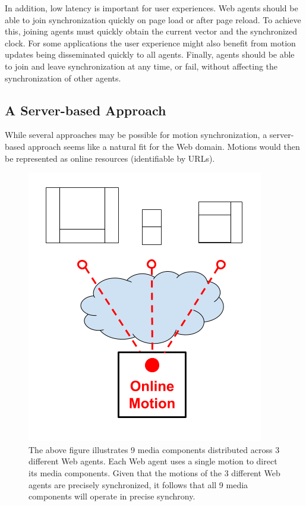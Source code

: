 In addition, low latency is important for user experiences. Web agents should
be able to join synchronization quickly on page load or after page reload. To
achieve this, joining agents must quickly obtain the current vector and the
synchronized clock. For some applications the user experience might also
benefit from motion updates being disseminated quickly to all agents. Finally,
agents should be able to join and leave synchronization at any time, or fail,
without affecting the synchronization of other agents.


\subsection {A Server-based Approach}

While several approaches may be possible for motion synchronization, a server-
based approach seems like a natural fit for the Web domain. Motions would then
be represented as online resources (identifiable by URLs).

\begin{figure}[h]
\centering
\includegraphics[scale=.4]{fig/motion-sync.png}
\caption{The above figure illustrates 9 media components distributed across 3 different Web agents. Each Web agent uses a single motion to direct its media components. Given that the motions of the 3 different Web agents are precisely synchronized, it follows that all 9 media components will operate in precise synchrony.}
\label{fig:motion-sync}
\end{figure}

